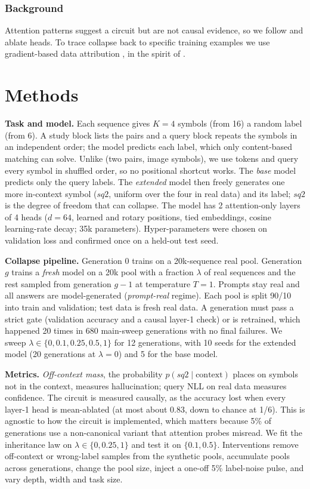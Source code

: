 \documentclass[10pt,letterpaper]{article}
\begin{document}
\subsubsection{Background}
Attention patterns suggest a circuit but are not causal evidence, so we follow \citet{conmy2023towards} and ablate heads. To trace collapse back to specific training examples we use gradient-based data attribution \citep{pruthi2020estimating}, in the spirit of \citet{chen2026mechanistic}.

\section{Methods}
\textbf{Task and model.} Each sequence gives $K{=}4$ symbols (from 16) a random label (from 6). A study block lists the pairs and a query block repeats the symbols in an independent order; the model predicts each label, which only content-based matching can solve. Unlike \citet{singh2024needs} (two pairs, image symbols), we use tokens and query every symbol in shuffled order, so no positional shortcut works. The \emph{base} model predicts only the query labels. The \emph{extended} model then freely generates one more in-context symbol ($sq2$, uniform over the four in real data) and its label; $sq2$ is the degree of freedom that can collapse. The model has 2 attention-only layers of 4 heads ($d{=}64$, learned and rotary positions, tied embeddings, cosine learning-rate decay; 35k parameters). Hyper-parameters were chosen on validation loss and confirmed once on a held-out test seed.

\textbf{Collapse pipeline.} Generation 0 trains on a 20k-sequence real pool. Generation $g$ trains a \emph{fresh} model on a 20k pool with a fraction $\lambda$ of real sequences and the rest sampled from generation $g{-}1$ at temperature $T{=}1$. Prompts stay real and all answers are model-generated (\emph{prompt-real} regime). Each pool is split 90/10 into train and validation; test data is fresh real data. A generation must pass a strict gate (validation accuracy and a causal layer-1 check) or is retrained, which happened 20 times in 680 main-sweep generations with no final failures. We sweep $\lambda \in \{0, 0.1, 0.25, 0.5, 1\}$ for 12 generations, with 10 seeds for the extended model (20 generations at $\lambda{=}0$) and 5 for the base model.

\textbf{Metrics.} \emph{Off-context mass}, the probability $p(sq2 \mid \text{context})$ places on symbols not in the context, measures hallucination; query NLL on real data measures confidence. The circuit is measured causally, as the accuracy lost when every layer-1 head is mean-ablated (at most about 0.83, down to chance at 1/6). This is agnostic to how the circuit is implemented, which matters because 5\% of generations use a non-canonical variant that attention probes misread. We fit the inheritance law on $\lambda \in \{0, 0.25, 1\}$ and test it on $\{0.1, 0.5\}$. Interventions remove off-context or wrong-label samples from the synthetic pools, accumulate pools across generations, change the pool size, inject a one-off 5\% label-noise pulse, and vary depth, width and task size.
\end{document}
